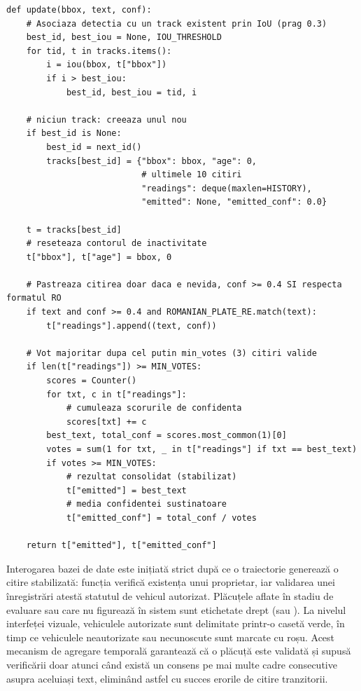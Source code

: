 \documentclass[../../main.tex]{subfiles}
\begin{document}
\begin{listing}[H]
\begin{verbatim}
def update(bbox, text, conf):
    # Asociaza detectia cu un track existent prin IoU (prag 0.3)
    best_id, best_iou = None, IOU_THRESHOLD
    for tid, t in tracks.items():
        i = iou(bbox, t["bbox"])
        if i > best_iou:
            best_id, best_iou = tid, i

    # niciun track: creeaza unul nou
    if best_id is None:
        best_id = next_id()
        tracks[best_id] = {"bbox": bbox, "age": 0,
                           # ultimele 10 citiri
                           "readings": deque(maxlen=HISTORY),
                           "emitted": None, "emitted_conf": 0.0}

    t = tracks[best_id]
    # reseteaza contorul de inactivitate
    t["bbox"], t["age"] = bbox, 0

    # Pastreaza citirea doar daca e nevida, conf >= 0.4 SI respecta formatul RO
    if text and conf >= 0.4 and ROMANIAN_PLATE_RE.match(text):
        t["readings"].append((text, conf))

    # Vot majoritar dupa cel putin min_votes (3) citiri valide
    if len(t["readings"]) >= MIN_VOTES:
        scores = Counter()
        for txt, c in t["readings"]:
            # cumuleaza scorurile de confidenta
            scores[txt] += c
        best_text, total_conf = scores.most_common(1)[0]
        votes = sum(1 for txt, _ in t["readings"] if txt == best_text)
        if votes >= MIN_VOTES:
            # rezultat consolidat (stabilizat)
            t["emitted"] = best_text
            # media confidentei sustinatoare
            t["emitted_conf"] = total_conf / votes

    return t["emitted"], t["emitted_conf"]
\end{verbatim}
\caption{Votarea temporală a plăcuțelor (\texttt{PlateTracker.update} din \texttt{license\_plate\_recognition\_system.py}).}
\label{lst:plate_vote}
\end{listing}

Interogarea bazei de date este inițiată strict după ce o traiectorie generează o citire stabilizată: funcția  verifică existența unui proprietar, iar validarea unei înregistrări atestă statutul de vehicul autorizat. Plăcuțele aflate în stadiu de evaluare sau care nu figurează în sistem sunt etichetate drept  (sau ). La nivelul interfeței vizuale, vehiculele autorizate sunt delimitate printr-o casetă verde, în timp ce vehiculele neautorizate sau necunoscute sunt marcate cu roșu. Acest mecanism de agregare temporală garantează că o plăcuță este validată și supusă verificării doar atunci când există un consens pe mai multe cadre consecutive asupra aceluiași text, eliminând astfel cu succes erorile de citire tranzitorii.
\end{document}
